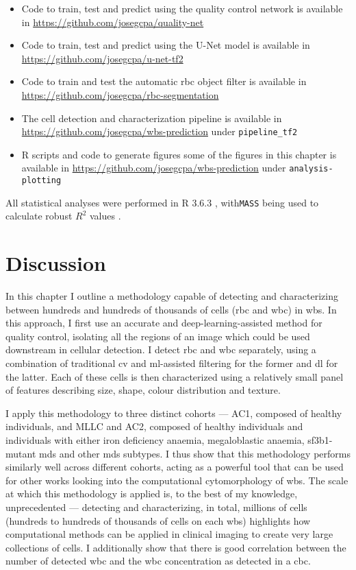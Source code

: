 \begin{itemize}
    \item Code to train, test and predict using the quality control network is available in \url{https://github.com/josegcpa/quality-net}
    \item Code to train, test and predict using the U-Net model is available in \url{https://github.com/josegcpa/u-net-tf2}
    \item Code to train and test the automatic \ac{rbc} object filter is available in \url{https://github.com/josegcpa/rbc-segmentation}
    \item The cell detection and characterization pipeline is available in \url{https://github.com/josegcpa/wbs-prediction} under \texttt{pipeline\_tf2}
    \item R scripts and code to generate figures some of the figures in this chapter is available in \url{https://github.com/josegcpa/wbs-prediction} under \texttt{analysis-plotting}

\end{itemize}

All statistical analyses were performed in R 3.6.3 \cite{R-core-team}, with\texttt{MASS} being used to calculate robust $R^2$ values \cite{Venables-2002-mass}. 

\section{Discussion}

In this chapter I outline a methodology capable of detecting and characterizing between hundreds and hundreds of thousands of cells (\ac{rbc} and \ac{wbc}) in \ac{wbs}. In this approach, I first use an accurate and deep-learning-assisted method for quality control, isolating all the regions of an image which could be used downstream in cellular detection. I detect \ac{rbc} and \ac{wbc} separately, using a combination of traditional \ac{cv} and \ac{ml}-assisted filtering for the former and \ac{dl} for the latter. Each of these cells is then characterized using a relatively small panel of features describing size, shape, colour distribution and texture.

I apply this methodology to three distinct cohorts --- AC1, composed of healthy individuals, and MLLC and AC2, composed of healthy individuals and individuals with either iron deficiency anaemia, megaloblastic anaemia, \ac{sf3b1}-mutant \ac{mds} and other \ac{mds} subtypes. I thus show that this methodology performs similarly well across different cohorts, acting as a powerful tool that can be used for other works looking into the computational cytomorphology of \ac{wbs}. The scale at which this methodology is applied is, to the best of my knowledge, unprecedented --- detecting and characterizing, in total, millions of cells (hundreds to hundreds of thousands of cells on each \ac{wbs}) highlights how computational methods can be applied in clinical imaging to create very large collections of cells. I additionally show that there is good correlation between the number of detected \ac{wbc} and the \ac{wbc} concentration as detected in a \ac{cbc}.
